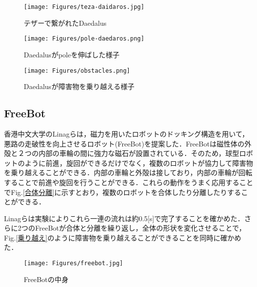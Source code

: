\documentclass[a4paper,11pt,dvipdfmx.uplatex]{jsarticle}
\begin{document}
\begin{figure}[htbp]
\centering
  \texttt{[image: Figures/teza-daidaros.jpg]}
  \caption{テザーで繋がれたDaedalus\cite{DAEDALUS}}
  \label{teza-Daedalus}
\end{figure}

\begin{figure}[htbp]
\centering
  \texttt{[image: Figures/pole-daedaros.png]}
  \caption{Daedalusがpoleを伸ばした様子\cite{DAEDALUS}}
  \label{pole-Daedalus}
\end{figure}

\begin{figure*}[htbp]
\centering
  \texttt{[image: Figures/obstacles.png]}
  \caption{Daedalusが障害物を乗り越える様子\cite{DAEDALUS}}
  \label{ovwecomeDaedalus}
\end{figure*}



\subsection{\bf FreeBot}
香港中文大学のLinagらは，磁力を用いたロボットのドッキング構造を用いて，悪路の走破性を向上させるロボット(FreeBot)を提案した\cite{FreeBot}．FreeBotは磁性体の外殻と２つの内部の車輪の間に強力な磁石が設置されている．そのため，球型ロボットのように前進，旋回ができるだけでなく，複数のロボットが協力して障害物を乗り越えることができる．内部の車輪と外殻は接しており，内部の車輪が回転することで前進や旋回を行うことができる．これらの動作をうまく応用することでFig.\ref{合体分離}に示すとおり，複数のロボットを合体したり分離したりすることができる．

Linagらは実験によりこれら一連の流れは約0.5[s]で完了することを確かめた．さらに2つのFreeBotが合体と分離を繰り返し，全体の形状を変化させることで，Fig.\ref{乗り越え}のように障害物を乗り越えることができることを同時に確かめた．

\begin{figure}[htbp]
\centering
  \texttt{[image: Figures/freebot.jpg]}
  \caption{FreeBotの中身\cite{FreeBot}}
  \label{FreeBotの中身}
\end{figure}

\vspace{20pt}
\end{document}
